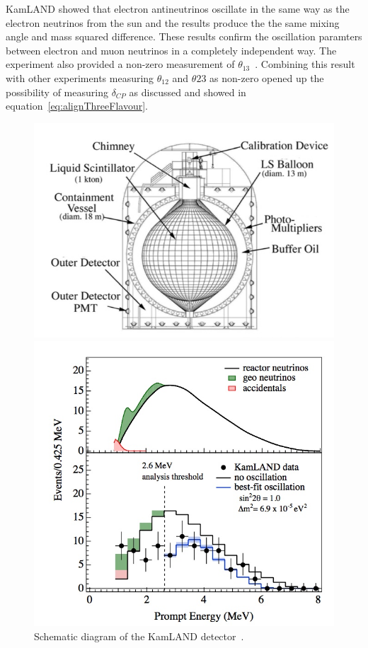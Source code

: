 KamLAND showed that electron antineutrinos oscillate in the same way as the electron neutrinos from the sun and the results produce the the same mixing angle and mass squared difference. These results confirm the oscillation paramters between electron and muon neutrinos in a completely independent way. The experiment also provided a non-zero measurement of $\theta_{13}$~\cite{107Gando}. Combining this result with other experiments measuring  $\theta_{12}$ and $\theta{23}$ as non-zero opened up the possibility of measuring $\delta_{CP}$ as discussed and showed in equation~\ref{eq:alignThreeFlavour}.

\begin{figure}[h!]
  \centering
  \begin{minipage}[b]{0.49\textwidth}
    \includegraphics[width=\textwidth]{figures/KamLAND.jpeg}
    \vspace{2mm}
    \caption{Schematic diagram of the KamLAND detector~\cite{46KamLAND}.}
    \label{fig:KamLAND}
  \end{minipage}
  \hfill
  \begin{minipage}[b]{0.49\textwidth}
    \includegraphics[width=\textwidth]{figures/KamLAND2.jpeg}

\end{minipage}
\end{figure}
